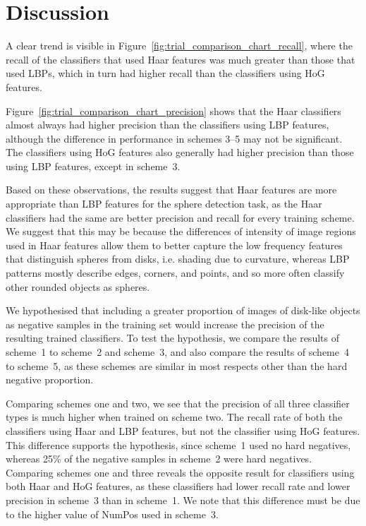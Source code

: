 \documentclass{llncs}
\begin{document}
	\section{Discussion} {


		A clear trend is visible in Figure~\ref{fig:trial_comparison_chart_recall}, where the recall of the classifiers that used Haar features was much greater than those that used LBPs, which in turn had higher recall than the classifiers using HoG features.

		Figure~\ref{fig:trial_comparison_chart_precision} shows that the Haar classifiers almost always had higher precision than the classifiers using LBP features, although the difference in performance in schemes 3--5 may not be significant.
		The classifiers using HoG features also generally had higher precision than those using LBP features, except in scheme~3.

		Based on these observations, the results suggest that Haar features are more appropriate than LBP features for the sphere detection task, as the Haar classifiers had the same are better precision and recall for every training scheme.
		We suggest that this may be because the differences of intensity of image regions used in Haar features allow them to better capture the low frequency features that distinguish spheres from disks, i.e. shading due to curvature, whereas LBP patterns mostly describe edges, corners, and points, and so more often classify other rounded objects as spheres.

		We hypothesised that including a greater proportion of images of disk-like objects as negative samples in the training set would increase the precision of the resulting trained classifiers.
		To test the hypothesis, we compare the results of scheme~1 to scheme~2 and scheme~3, and also compare the results of scheme~4 to scheme~5, as these schemes are similar in most respects other than the hard negative proportion.

		Comparing schemes one and two, we see that the precision of all three classifier types is much higher when trained on scheme two. The recall rate of both the classifiers using Haar and LBP features, but not the classifier using HoG features.
		This difference supports the hypothesis, since scheme~1 used no hard negatives, whereas 25\% of the negative samples in scheme~2 were hard negatives.
		Comparing schemes one and three reveals the opposite result for classifiers using both Haar and HoG features, as these classifiers had lower recall rate and lower precision in scheme~3 than in scheme~1. We note that this difference must be due to the higher value of NumPos used in scheme~3.

}
\end{document}
